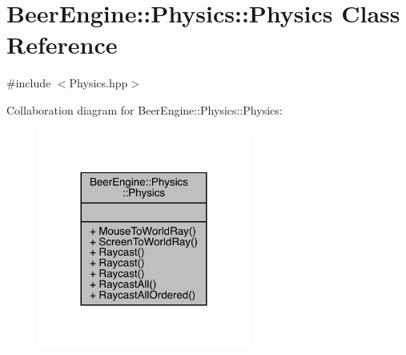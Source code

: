 \hypertarget{class_beer_engine_1_1_physics_1_1_physics}{}\section{Beer\+Engine\+:\+:Physics\+:\+:Physics Class Reference}
\label{class_beer_engine_1_1_physics_1_1_physics}


{\ttfamily \#include $<$Physics.\+hpp$>$}



Collaboration diagram for Beer\+Engine\+:\+:Physics\+:\+:Physics\+:\nopagebreak
\begin{figure}[H]
\begin{center}
\leavevmode
\includegraphics[width=197pt]{class_beer_engine_1_1_physics_1_1_physics__coll__graph}
\end{center}
\end{figure}
